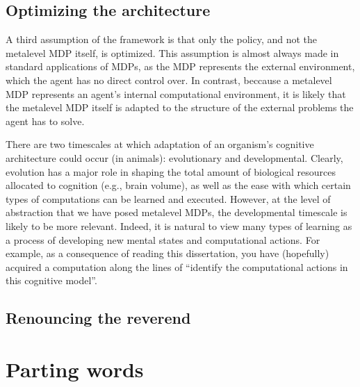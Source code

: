 \subsection{Optimizing the architecture}

A third assumption of the framework is that only the policy, and not the metalevel MDP itself, is optimized. This assumption is almost always made in standard applications of MDPs, as the MDP represents the external environment, which the agent has no direct control over. In contrast, beccause a metalevel MDP represents an agent's internal computational environment, it is likely that the metalevel MDP itself is adapted to the structure of the external problems the agent has to solve.

There are two timescales at which adaptation of an organism's cognitive architecture could occur (in animals): evolutionary and developmental. Clearly, evolution has a major role in shaping the total amount of biological resources allocated to cognition (e.g., brain volume), as well as the ease with which certain types of computations can be learned and executed. However, at the level of abstraction that we have posed metalevel MDPs, the developmental timescale is likely to be more relevant. Indeed, it is natural to view many types of learning as a process of developing new mental states and computational actions. For example, as a consequence of reading this dissertation, you have (hopefully) acquired a computation along the lines of ``identify the computational actions in this cognitive model''.

\subsection{Renouncing the reverend}  %


\section{Parting words}



